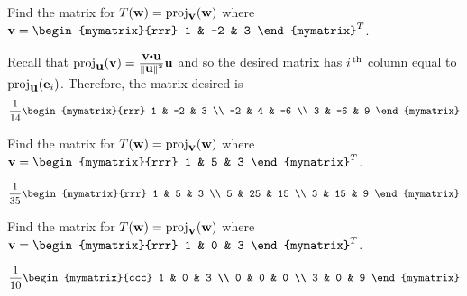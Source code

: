 \begin{ex}  Find the matrix for $T(\vect{w}) = \proj_{\vect{v}}(\vect{w}) $
  where $\vect{v}=\begin{mymatrix}{rrr}
    1 & -2 & 3
  \end{mymatrix} ^{T}$.
  \begin{sol}
    Recall that $\proj_{\vect{u}}(\vect{v}) =\frac{\vect{v}\dotprod\vect{u} }{\norm{\vect{u}} ^{2}}\vect{u}$ and so the desired matrix
    has $i^{\,\rm th}$ column equal to $\proj_{\vect{u}}(\vect{e}_{i})$. Therefore, the matrix desired is
    \begin{equation*}
      \frac{1}{14}\begin{mymatrix}{rrr}
        1 & -2 & 3 \\
        -2 & 4 & -6 \\
        3 & -6 & 9
      \end{mymatrix}
    \end{equation*}
  \end{sol}
\end{ex}

\begin{ex}  Find the matrix for $T(\vect{w}) = \proj_{\vect{v}}(\vect{w}) $
  where $\vect{v}=\begin{mymatrix}{rrr}
    1 & 5 & 3
  \end{mymatrix} ^{T}$.
  \begin{sol}
    \begin{equation*}
      \frac{1}{35}\begin{mymatrix}{rrr}
        1 & 5 & 3 \\
        5 & 25 & 15 \\
        3 & 15 & 9
      \end{mymatrix}
    \end{equation*}
  \end{sol}
\end{ex}

\begin{ex} Find the matrix for $T(\vect{w}) = \proj_{\vect{v}}(\vect{w}) $
  where $\vect{v}=\begin{mymatrix}{rrr}
    1 & 0 & 3
  \end{mymatrix} ^{T}$.
  \begin{sol}
    \begin{equation*}
      \frac{1}{10}\begin{mymatrix}{ccc}
        1 & 0 & 3 \\
        0 & 0 & 0 \\
        3 & 0 & 9
      \end{mymatrix}
    \end{equation*}
  \end{sol}
\end{ex}

